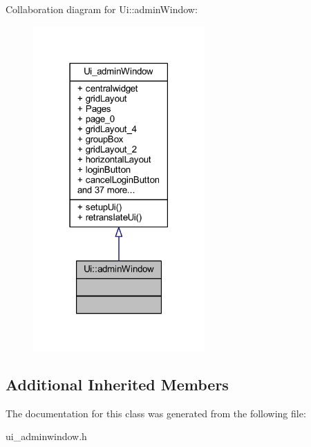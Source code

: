 Collaboration diagram for Ui\+:\+:admin\+Window\+:\nopagebreak
\begin{figure}[H]
\begin{center}
\leavevmode
\includegraphics[width=186pt]{class_ui_1_1admin_window__coll__graph}
\end{center}
\end{figure}
\subsection*{Additional Inherited Members}


The documentation for this class was generated from the following file\+:\begin{DoxyCompactItemize}
\item 
ui\+\_\+adminwindow.\+h\end{DoxyCompactItemize}
